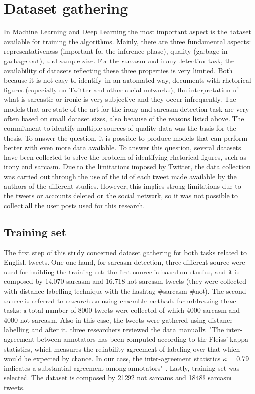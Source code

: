 \section{Dataset gathering}
In Machine Learning and Deep Learning the most important aspect is the dataset available for training the algorithms. Mainly, there are three fundamental aspects: representativeness (important for the inference phase), quality (garbage in garbage out), and sample size. For the sarcasm and irony detection task, the availability of datasets reflecting these three properties is very limited. Both because it is not easy to identify, in an automated way, documents with rhetorical figures (especially on Twitter and other social networks), the interpretation of what is sarcastic or ironic is very subjective and they occur infrequently. The models that are state of the art for the irony and sarcasm detection task are very often based on small dataset sizes, also because of the reasons listed above. The commitment to identify multiple sources of quality data was the basis for the thesis. To answer the question, it is possible to produce models that can perform better with even more data available. To answer this question, several datasets have been collected to solve the problem of identifying rhetorical figures, such as irony and sarcasm. Due to the limitations imposed by Twitter, the data collection was carried out through the use of the id of each tweet made available by the authors of the different studies. However, this implies strong limitations due to the tweets or accounts deleted on the social network, so it was not possible to collect all the user posts used for this research. 

\subsection{Training set}
The first step of this study concerned dataset gathering for both tasks related to English tweets. One one hand, for sarcasm detection, three different source were used for building the training set: the first source is based on \cite{Ptacek} studies, and it is composed by 14.070 sarcasm and 16.718 not sarcasm tweets (they were collected with distance labelling technique with the hashtag \#sarcasm \#not). The second source is referred to \cite{bma} research on using ensemble methods for addressing these tasks: a total number of 8000 tweets were collected of which 4000 sarcasm and 4000 not sarcasm. Also in this case, the tweets were gathered using distance labelling and after it, three researchers reviewed the data manually. "The inter-agreement between annotators has been computed according to the Fleiss’ kappa statistics, which measures
the reliability agreement of labeling over that which would be
expected by chance. In our case, the inter-agreement statistics $\kappa$ = 0.79 indicates a substantial agreement among annotators" \cite{bma}. Lastly, \cite{ghosh} training set was selected. The dataset is composed by 21292 not sarcams and 18488 sarcasm tweets. 


